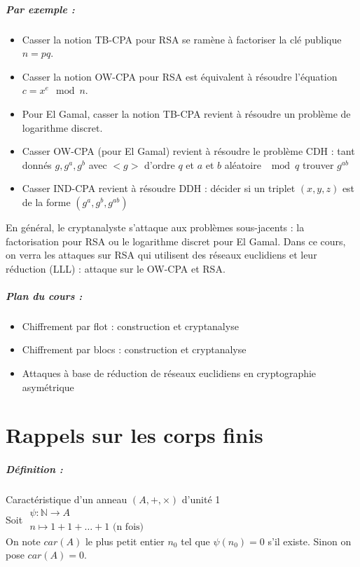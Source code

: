 \documentclass[12pt,a4paper]{report}
\begin{document}
\paragraph{Par exemple :\\}
\begin{itemize}
\item Casser la notion TB-CPA pour RSA se ramène à factoriser la clé publique $n=pq$.
\item Casser la notion OW-CPA pour RSA est équivalent à résoudre l'équation $c=x^e \mod n$.
\item Pour El Gamal, casser la notion TB-CPA revient à résoudre un problème de logarithme discret.
\item Casser OW-CPA (pour El Gamal) revient à résoudre le problème CDH : tant donnés $g,g^a,g^b$ avec $<g>$ d'ordre $q$ et $a$ et $b$ aléatoire $\mod q$ trouver $g^{ab}$
\item Casser IND-CPA revient à résoudre DDH : décider si un triplet $(x,y,z)$ est de la forme $(g^a,g^b,g^{ab})$
\end{itemize}
En général, le cryptanalyste s'attaque aux problèmes sous-jacents : la factorisation pour RSA ou le logarithme discret pour El Gamal.
Dans ce cours, on verra les attaques sur RSA qui utilisent des réseaux euclidiens et leur réduction (LLL) : attaque sur le OW-CPA et RSA.
\paragraph{Plan du cours :\\}
\begin{itemize}
\item Chiffrement par flot : construction et cryptanalyse
\item Chiffrement par blocs : construction et cryptanalyse
\item Attaques à base de réduction de réseaux euclidiens en cryptographie asymétrique
\end{itemize}

\chapter{Rappels sur les corps finis}
\paragraph{Définition :} Caractéristique d'un anneau $(A,+,\times)$ d'unité 1\\
Soit $\begin{array}{l}
\psi : \mathbb{N} \longrightarrow A\\
n \longmapsto 1+1+\ldots+1 \mbox{ (n fois)}\end{array}$\\
On note $car(A)$ le plus petit entier $n_0$ tel que $\psi(n_0)=0$ s'il existe. Sinon on pose $car(A)=0$.\\
\end{document}
